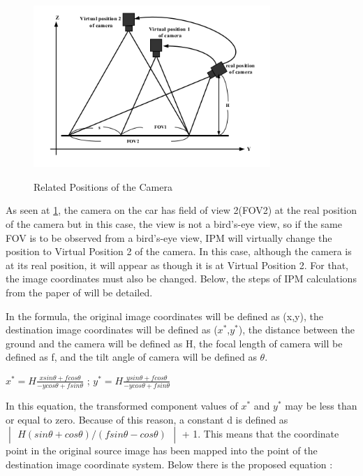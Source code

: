 \begin{figure}[H]
\centering
  \includegraphics[width=0.8\textwidth]{./Bilder/Related_positions_of_the_camera.png}\label{Procedures_of_IPM}
  \caption{Related Positions of the Camera \cite{IPM}}
\end{figure}

 As seen at \ref{Procedures_of_IPM}, the camera on the car has field of view 2(FOV2) at the real position of the camera but in this case, the view is not a bird's-eye view, so if the same FOV is to be observed from a bird's-eye view, IPM will virtually change the position to Virtual Position 2 of the camera. In this case, although the camera is at its real position, it will appear as though it is at Virtual Position 2. For that, the image coordinates must also be changed. Below, the steps of IPM calculations from the paper of \cite{IPM} will be detailed.
 
In the formula, the original image coordinates will be defined as (x,y), the destination image coordinates will be defined as ($x^*$,$y^*$), the distance between the ground and the camera will be defined as H, the focal length of camera will be defined as f, and the tilt angle of camera will be defined as $\theta$.
 
\begin{center}
 $x^* = H \frac{x sin \theta + f cos \theta}{-y cos \theta + f sin \theta}$ ;
 $y^* = H \frac{y sin \theta + f cos \theta}{-y cos \theta + f sin \theta}$ 
\end{center}

In this equation, the transformed component values of $x^*$ and $y^*$ may be less than or equal to zero. Because of 
this reason, a constant d is defined as $
\begin{vmatrix}
H(sin \theta + cos \theta)/(f sin \theta - cos \theta) 
\end{vmatrix}
$  + 1. This means that the coordinate point in the original source image has been mapped into the point of the destination image coordinate system. Below there is the proposed equation :
 
